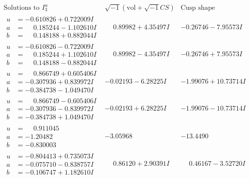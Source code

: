 \documentclass[1p]{elsarticle_modified}
\theoremstyle{definition}
\newcommand{\I}{\sqrt{-1}}
\begin{document}
$$\begin{array}{c|c|c}  
\text{Solutions to }I^u_{3}& \I (\text{vol} + \sqrt{-1}CS) & \text{Cusp shape}\\
 \hline 
\begin{aligned}
u &= -0.610826 + 0.722009 I \\
a &= \phantom{-}0.185244 - 1.102610 I \\
b &= \phantom{-}0.148188 + 0.882044 I\end{aligned}
 & \phantom{-}0.89982 + 4.35497 I & -0.26746 - 7.95573 I \\ \hline\begin{aligned}
u &= -0.610826 - 0.722009 I \\
a &= \phantom{-}0.185244 + 1.102610 I \\
b &= \phantom{-}0.148188 - 0.882044 I\end{aligned}
 & \phantom{-}0.89982 - 4.35497 I & -0.26746 + 7.95573 I \\ \hline\begin{aligned}
u &= \phantom{-}0.866749 + 0.605406 I \\
a &= -0.307936 + 0.839972 I \\
b &= -0.384738 - 1.049470 I\end{aligned}
 & -0.02193 - 6.28225 I & -1.99076 + 10.73714 I \\ \hline\begin{aligned}
u &= \phantom{-}0.866749 - 0.605406 I \\
a &= -0.307936 - 0.839972 I \\
b &= -0.384738 + 1.049470 I\end{aligned}
 & -0.02193 + 6.28225 I & -1.99076 - 10.73714 I \\ \hline\begin{aligned}
u &= \phantom{-}0.911045\phantom{ +0.000000I} \\
a &= -1.20482\phantom{ +0.000000I} \\
b &= -0.830003\phantom{ +0.000000I}\end{aligned}
 & -3.05968\phantom{ +0.000000I} & -13.4490\phantom{ +0.000000I} \\ \hline\begin{aligned}
u &= -0.804413 + 0.735073 I \\
a &= -0.075710 - 0.838757 I \\
b &= -0.106747 + 1.182610 I\end{aligned}
 & \phantom{-}0.86120 + 2.90391 I & \phantom{-}0.46167 - 3.52720 I \\ \hline\begin{aligned}

\end{aligned}
\end{array}$$
\end{document}
